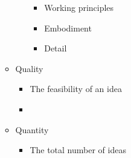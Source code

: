 \begin{itemize}
\begin{itemize}
\begin{itemize}
\begin{itemize}
              \item Working principles

              \item Embodiment

              \item Detail

            \end{itemize}

        \end{itemize}

      \item Quality

        \begin{itemize}

          \item The feasibility of an idea

          \item 

        \end{itemize}

      \item Quantity

        \begin{itemize}

          \item The total number of ideas

        \end{itemize}
        
    \end{itemize}

\end{itemize}



